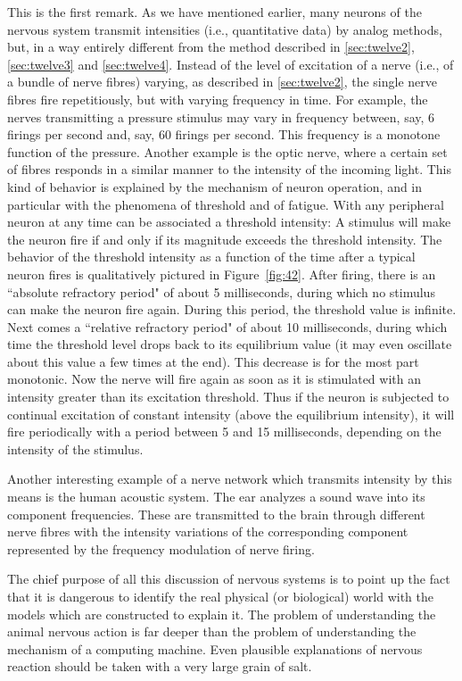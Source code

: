 \documentclass[twocolumn,preprintnumbers,amsmath,amssymb,floatfix]{revtex4}
\begin{document}
This is the first remark. As we have mentioned earlier, many
neurons of the nervous system transmit intensities (i.e.,
quantitative data) by analog methods, but, in a way entirely
different from the method described in \ref{sec:twelve2},
\ref{sec:twelve3} and \ref{sec:twelve4}. Instead of the level of
excitation of a nerve (i.e., of a bundle of nerve fibres) varying,
as described in \ref{sec:twelve2}, the single nerve fibres fire
repetitiously, but with varying frequency in time. For example,
the nerves transmitting a pressure stimulus may vary in frequency
between, say, 6 firings per second and, say, 60 firings per
second. This frequency is a monotone function of the pressure.
Another example is the optic nerve, where a certain set of fibres
responds in a similar manner to the intensity of the incoming
light. This kind of behavior is explained by the mechanism of
neuron operation, and in particular with the phenomena of
threshold and of fatigue. With any peripheral neuron at any time
can be associated a threshold intensity: A stimulus will make the
neuron fire if and only if its magnitude exceeds the threshold
intensity. The behavior of the threshold intensity as a function
of the time after a typical neuron fires is qualitatively pictured
in Figure~\ref{fig:42}. After firing, there is an ``absolute
refractory period" of about 5 milliseconds, during which no
stimulus can make the neuron fire again. During this period, the
threshold value is infinite. Next comes a ``relative refractory
period" of about 10 milliseconds, during which time the threshold
level drops back to its equilibrium value (it may even oscillate
about this value a few times at the end). This decrease is for the
most part monotonic. Now the nerve will fire again as soon as it
is stimulated with an intensity greater than its excitation
threshold. Thus if the neuron is subjected to continual excitation
of constant intensity (above the equilibrium intensity), it will
fire periodically with a period between 5 and 15 milliseconds,
depending on the intensity of the stimulus.

Another interesting example of a nerve network which transmits
intensity by this means is the human acoustic system. The ear
analyzes a sound wave into its component frequencies. These are
transmitted to the brain through different nerve fibres with the
intensity variations of the corresponding component represented by
the frequency modulation of nerve firing.

The chief purpose of all this discussion of nervous systems is to
point up the fact that it is dangerous to identify the real
physical (or biological) world with the models which are
constructed to explain it. The problem of understanding the animal
nervous action is far deeper than the problem of understanding the
mechanism of a computing machine. Even plausible explanations of
nervous reaction should be taken with a very large grain of salt.
\end{document}
